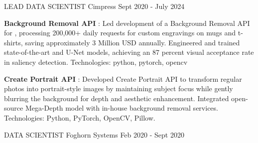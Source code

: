 
\begin{cventries}

    \cventry
    {LEAD DATA SCIENTIST} %
    {Cimpress} %
    {} %
    {Sept 2020 - July 2024} %
    {
      \begin{cvitems} %
      \item{\textbf{Background Removal API} : \newline Led development of a Background Removal API for , processing 
      200,000+ daily requests for custom engravings on mugs and t-shirts, 
      saving approximately 3 Million USD annually. \newline 
      Engineered and trained state-of-the-art  and 
      U-Net models, achieving an 87 percent visual acceptance rate in saliency 
      detection. \newline 
      Technologies: python, pytorch, opencv }
      \item{\textbf{Create Portrait API} : \newline
      Developed Create Portrait API to transform 
      regular photos into portrait-style images by maintaining subject 
      focus while gently blurring the background for depth and 
      aesthetic enhancement. \newline 
      Integrated open-source Mega-Depth model with in-house background removal services. \newline
      Technologies: Python, PyTorch, OpenCV, Pillow. }
	\end{cvitems}
    }
\vspace{2em} %
  \cventry
    {DATA SCIENTIST} %
    {Foghorn Systems} %
    {} %
    {Feb 2020 - Sept 2020} %
    {
      \begin{cvitems} %

\end{cvitems}}
\end{cventries}
